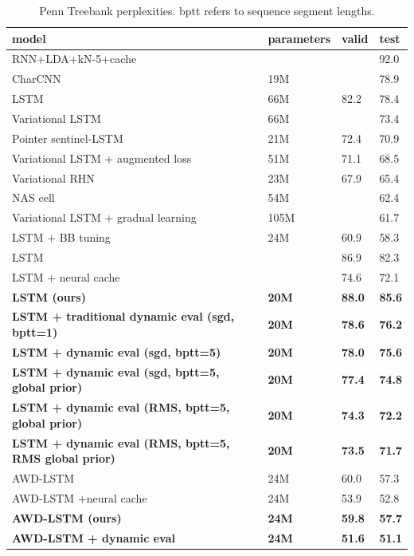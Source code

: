 \documentclass{article} %
\begin{document}
\begin{table}[tb]
\begin{center} 
\begin{tabular}{  l  l  l  l } \toprule 
model & parameters & valid & test  \\ 
\midrule 
RNN+LDA+kN-5+cache \citep{Mikolov2012b}& & & 92.0 \\ 
CharCNN \citep{Kim2015} & 19M & & 78.9 \\
LSTM \citep{Zaremba-2014} & 66M & 82.2 & 78.4 \\
Variational LSTM \citep{gal2016} &66M & & 73.4 \\
Pointer sentinel-LSTM \citep{Merity2016} &21M & 72.4 & 70.9 \\
Variational LSTM + augmented loss \citep{inan2017}& 51M &71.1 & 68.5 \\
Variational RHN \citep{zilly2017}& 23M & 67.9 & 65.4\\
NAS cell  \citep{zoph2017} &54M & & 62.4 \\
Variational LSTM + gradual learning \citep{aharoni2017} & 105M & & 61.7 \\
LSTM + BB tuning \citep{melis2017}& 24M & 60.9 & 58.3 \\
\midrule
LSTM \citep{grave2017}& & 86.9 & 82.3 \\
LSTM + neural cache \citep{grave2017}& & 74.6 & 72.1 \\
\textbf{LSTM (ours)} & \textbf{20M} & \textbf{88.0} & \textbf{85.6} \\
\textbf{LSTM + traditional dynamic eval (sgd, bptt=1)}& \textbf{20M} & \textbf{78.6} & \textbf{76.2}\\
\textbf{LSTM + dynamic eval (sgd, bptt=5)}& \textbf{20M} & \textbf{78.0} & \textbf{75.6}\\
\textbf{LSTM + dynamic eval (sgd, bptt=5, global prior)}& \textbf{20M} & \textbf{77.4} & \textbf{74.8}\\
\textbf{LSTM + dynamic eval (RMS, bptt=5, global prior)}& \textbf{20M} & \textbf{74.3} & \textbf{72.2}\\
\textbf{LSTM + dynamic eval (RMS, bptt=5, RMS global prior)}& \textbf{20M} & \textbf{73.5} & \textbf{71.7}\\
\midrule
AWD-LSTM \citep{merity2017}& 24M & 60.0 & 57.3 \\
AWD-LSTM +neural cache \citep{merity2017}& 24M & 53.9 & 52.8 \\
\textbf{AWD-LSTM (ours)} & \textbf{24M} & \textbf{59.8} & \textbf{57.7} \\
\textbf{AWD-LSTM + dynamic eval}& \textbf{24M} & \textbf{51.6} & \textbf{51.1}\\
\bottomrule
\end{tabular} 
\end{center}
\caption{Penn Treebank perplexities. bptt refers to sequence segment lengths.}
\label{tab:ptb}
\end{table}
\end{document}
